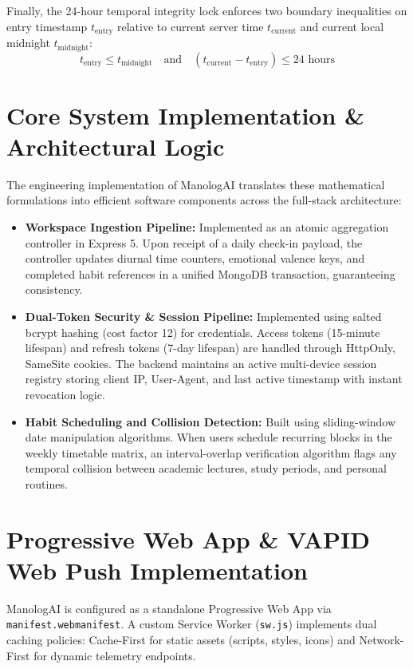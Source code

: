 Finally, the 24-hour temporal integrity lock enforces two boundary inequalities on entry timestamp $t_{\text{entry}}$ relative to current server time $t_{\text{current}}$ and current local midnight $t_{\text{midnight}}$:
\begin{equation}
t_{\text{entry}} \le t_{\text{midnight}} \quad \text{and} \quad (t_{\text{current}} - t_{\text{entry}}) \le 24 \text{ hours}
\end{equation}

\section{Core System Implementation \& Architectural Logic}

The engineering implementation of ManologAI translates these mathematical formulations into efficient software components across the full-stack architecture:

\begin{itemize}
  \item \textbf{Workspace Ingestion Pipeline:} Implemented as an atomic aggregation controller in Express 5. Upon receipt of a daily check-in payload, the controller updates diurnal time counters, emotional valence keys, and completed habit references in a unified MongoDB transaction, guaranteeing consistency.
  \item \textbf{Dual-Token Security \& Session Pipeline:} Implemented using salted bcrypt hashing (cost factor 12) for credentials. Access tokens (15-minute lifespan) and refresh tokens (7-day lifespan) are handled through HttpOnly, SameSite cookies. The backend maintains an active multi-device session registry storing client IP, User-Agent, and last active timestamp with instant revocation logic.
  \item \textbf{Habit Scheduling and Collision Detection:} Built using sliding-window date manipulation algorithms. When users schedule recurring blocks in the weekly timetable matrix, an interval-overlap verification algorithm flags any temporal collision between academic lectures, study periods, and personal routines.
\end{itemize}

\section{Progressive Web App \& VAPID Web Push Implementation}

ManologAI is configured as a standalone Progressive Web App via \texttt{manifest.\-webmanifest}. A custom Service Worker (\texttt{sw.js}) implements dual caching policies: Cache-First for static assets (scripts, styles, icons) and Network-First for dynamic telemetry endpoints. 

